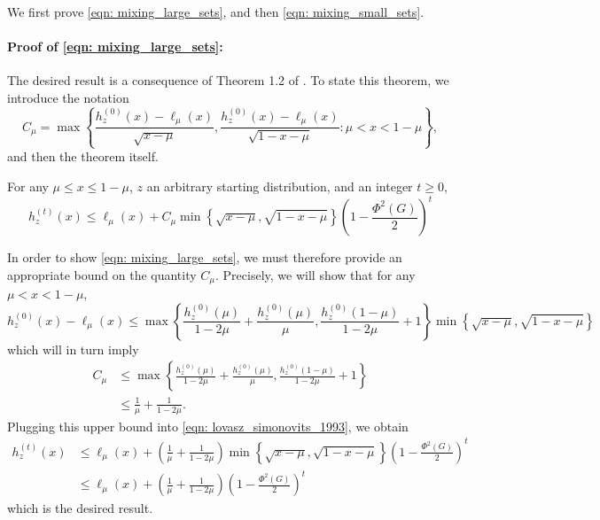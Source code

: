 \documentclass[11pt,twoside]{article}
\newcommand{\set}[1]{\left\{#1\right\}}
\newcommand{\1}{\mathbbm{1}}
\begin{document}
We first prove \eqref{eqn: mixing_large_sets}, and then \eqref{eqn: mixing_small_sets}.
\paragraph{Proof of \eqref{eqn: mixing_large_sets}:}
The desired result is a consequence of Theorem 1.2 of \cite{lovasz1990}. To state this theorem, we introduce the notation
\begin{equation*}
C_{\mu} = \max \set{\frac{h_z^{(0)}(x) - \ell_{\mu}(x)}{\sqrt{x - \mu}}, \frac{h_z^{(0)}(x) - \ell_{\mu}(x)}{\sqrt{1 - x - \mu}}: \mu < x < 1 - \mu},
\end{equation*}
and then the theorem itself.
\begin{theorem}
	\label{thm: lovasz_simonovits_1993}
	For any $\mu \leq x \leq 1 - \mu$, $z$ an arbitrary starting distribution, and an integer $t \geq 0$,
	\begin{equation}
	\label{eqn: lovasz_simonovits_1993}
	h_z^{(t)}(x) \leq \ell_{\mu}(x) + C_{\mu} \min \set{\sqrt{x - \mu}, \sqrt{1 - x - \mu}} \left(1 - \frac{\Phi^2(G)}{2}\right)^t
	\end{equation}
\end{theorem}
In order to show \eqref{eqn: mixing_large_sets}, we must therefore provide an appropriate bound on the quantity $C_{\mu}$. Precisely, we will show that for any $\mu < x < 1 - \mu$,
\begin{equation}
\label{eqn: lt_ub_1}
h_z^{(0)}(x) - \ell_{\mu}(x) \leq \max \set{\frac{h_z^{(0)}(\mu)}{1 - 2\mu} + \frac{h_z^{(0)}(\mu)}{\mu} , \frac{h_z^{(0)}(1 - \mu) }{1 - 2\mu} + 1 } \min \set{\sqrt{x - \mu},\sqrt{1 - x - \mu}}
\end{equation}
which will in turn imply
\begin{align*}
C_{\mu} & \leq \max \set{\frac{h_z^{(0)}(\mu)}{1 - 2\mu} + \frac{h_z^{(0)}(\mu)}{\mu} , \frac{h_z^{(0)}(1 - \mu) }{1 - 2\mu} + 1 } \\
& \leq \frac{1}{\mu} + \frac{1}{1 - 2\mu}.
\end{align*}
Plugging this upper bound into \eqref{eqn: lovasz_simonovits_1993}, we obtain
\begin{align*}
h_z^{(t)}(x) & \leq \ell_{\mu}(x) +  \left(\frac{1}{\mu} + \frac{1}{1 - 2\mu}\right)\min \set{\sqrt{x - \mu}, \sqrt{1 - x - \mu}} \left(1 - \frac{\Phi^2(G)}{2}\right)^t \\
& \leq \ell_{\mu}(x) +  \left(\frac{1}{\mu} + \frac{1}{1 - 2\mu}\right)\left(1 - \frac{\Phi^2(G)}{2}\right)^t
\end{align*}
which is the desired result.
\end{document}

